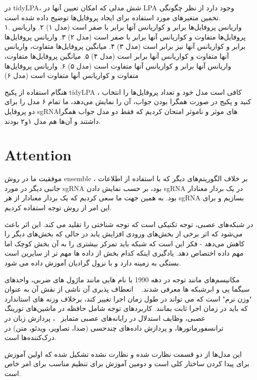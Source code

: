 \documentclass[12pt,a4paper,BCOR=.7cm,headsepline,bibliography=totoc]{report}
\begin{document}
 در tidyLPA، شش مدلی که امکان تعیین آنها در LPA وجود دارد از نظر چگونگی تخمین متغیرهای مورد استفاده برای ایجاد پروفایل‌ها توضیح داده شده است.\\
 ۱. واریانس پروفایل‌ها برابر و کواریانس آنها برابر با صفر است (مدل ۱) ۲. واریانس پروفایل‌ها متفاوت و کواریانس آنها برابر با صفر است (مدل ۲) ۳. واریانس پروفایل‌ها برابر و کواریانس آنها نیز برابر است (مدل ۳) ۴. میانگین پروفایل‌ها متفاوت، واریانس آنها متفاوت و کواریانس آنها برابر است (مدل ۴) ۵. میانگین پروفایل‌ها متفاوت، واریانس آنها برابر و کواریانس آنها متفاوت است (مدل ۵) ۶. واریانس پروفایل‌ها متفاوت و کواریانس آنها متفاوت است (مدل ۶)

هنگام استفاده از پکیج tidyLPA ، کافی است مدل خود و تعداد پروفایل‌ها را انتخاب کنید و پکیج در صورت همگرا بودن جواب،‌ آن را نمایش می‌دهد، ما تمام ۶ مدل را برای دو پروفایل sgRNAهای موثر و ناموثر امتحان کردیم که فقط دو مدل جواب همگرا داشتند و آن‌ها هم مدل ۱و۲ بودند.
\section{Attention}
موفقیت ما در روش ensemble ، بر خلاف الگوریتم‌های دیگر که با استفاده از اطلاعات جانبی دیگر در مورد sgRNA بود، بر حسب نمایش دادن sgRNA در یک بردار معنادار بود. به همین جهت ما سعی کردیم که یک بردار معنادار از هر ‌sgRNA بسازیم و برای این امر از روش توجه استفاده کردیم.

در شبکه‌های عصبی، توجه تکنیکی است که توجه شناختی را تقلید می کند. این اثر باعث می‌شود که اثر برخی از بخش‌های ورودی افزایش یابد در حالی که بخش‌های دیگر را کاهش می‌دهد - فکر این است که شبکه باید تمرکز بیشتری را به آن بخش کوچک اما مهم داده اختصاص دهد. یادگیری اینکه کدام بخش از داده ها مهم تر از سایرین است بستگی به زمینه دارد و با نزول گرادیان آموزش داده می شود.

مکانیسم‌های مانند توجه در دهه 1990 با نام هایی مانند ماژول های ضربی، واحدهای سیگما پی و ابرشبکه ها معرفی شدند. ~\cite{Yann} انعطاف پذیری آن ناشی از نقش آن به عنوان "وزن نرم" است که می تواند در طول زمان اجرا تغییر کند، برخلاف وزنه های استاندارد که باید در زمان اجرا ثابت بمانند. کاربردهای توجه شامل حافظه در ماشین‌های تورینگ عصبی، وظایف استدلال در رایانه‌های عصبی متمایز ~\cite{Hybrid}، پردازش زبان در ترانسفورماتورها، و پردازش داده‌های چندحسی (صدا، تصاویر، ویدئو، متن) در درک‌کننده‌ها است.~\cite{Vaswani, Ramachandran, Jaegle, Ray} 	

این مدل‌ها از دو قسمت نظارت شده و  نظارت نشده تشکیل شده که اولین آموزش برای پیدا کردن ساختار کلی است و دومین آموزش برای تنظیم مناسب برای امر خاص است.
\end{document}
